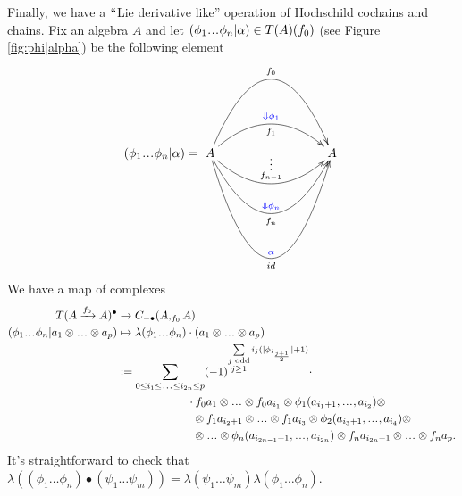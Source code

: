 Finally, we have a $``$Lie derivative like'' 
operation of Hochschild cochains and chains. 
Fix an algebra $A$ and let 
$(\phi_1\smdots \phi_n|\alpha) \in T(A)(f_0)$ 
(see Figure \ref{fig:phi|alpha}) be the following 
element
\begin{align*}
(\phi_1\smdots \phi_n|\alpha)
= 
\xymatrix{
A \ar@/^5pc/[rrr]^{f_0} 
\ar@/^2pc/[rrr]^{\textcolor{blue}{ \Downarrow \phi_1}}_{f_1} 
\ar@/_2pc/[rrr]^{\substack{\vdots\\ f_{n-1}}}
\ar@/_4pc/[rrr]^{\textcolor{blue}{\Downarrow \phi_n}}_{f_n}
\ar@/_7pc/[rrr]_{id}^{\substack{\textcolor{blue}{\alpha}\\}}
&&& A
}
\end{align*}
We have a map of complexes 
\begin{align*}
T(A \xrightarrow{f_0} A)^\bullet
&\to
C_{-\bullet}(A, _{f_0}A)\\
(\phi_1\smdots \phi_n|
  a_1 \otimes \smdots \otimes a_p)
&\mapsto
\lambda(\phi_1\smdots \phi_n)\cdot 
  (a_1 \otimes \smdots \otimes a_p)\\
&:=
\sum \limits_{0 \leq i_1 \leq \smdots \leq i_{2n} \leq p}
(-1)^{\sum \limits_{\substack{
  j \textrm{ odd}\\
  j \geq 1}}
  i_j(|\phi_{i_{\frac{j+1}{2}}}| + 1)} \cdot\\ 
&\phantom{{}moveovermov{}}  
\cdot f_0a_1 \otimes \smdots \otimes f_0a_{i_1} \otimes 
\phi_1(a_{i_1+1}, \smdots, a_{i_2}) \otimes \\
&\phantom{{}moveovermove{}}
\otimes f_1a_{i_2+1} \otimes \smdots \otimes f_1a_{i_3} \otimes 
\phi_2(a_{i_3+1}, \smdots, a_{i_4}) \otimes \\
&\phantom{{}moveovermove{}}
\otimes \smdots \otimes
\phi_n(a_{i_{2n-1}+1}, \smdots, a_{i_{2n}}) \otimes
f_na_{i_{2n}+1} \otimes \smdots \otimes f_na_p.
\end{align*}
It's straightforward to check that 
$\lambda((\phi_1 \dots \phi_n) \bullet 
(\psi_1 \dots \psi_m)) = \lambda(\psi_1 \dots \psi_m) 
\lambda(\phi_1 \dots \phi_n)$.
%
